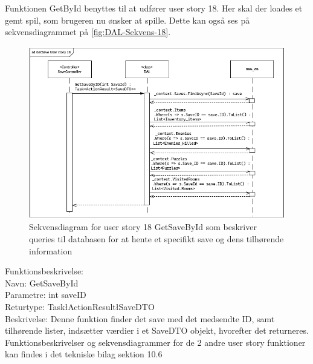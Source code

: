 Funktionen GetById benyttes til at udfører user story 18.
Her skal der loades et gemt spil, som brugeren nu ønsker at spille. 
Dette kan også ses på sekvensdiagrammet på \autoref{fig:DAL-Sekvens-18}.\\

\begin{figure}[H]
\centering
\includegraphics[width = \textwidth]{02-Body/Images/DAL-Database/GetSavesByIdSd.PNG}
\caption{Sekvensdiagram for user story 18 GetSaveById som beskriver queries til databasen for at hente et specifikt save og dens tilhørende information}
\label{fig:DAL-Sekvens-18}
\end{figure}

Funktionsbeskrivelse:\\
Navn: GetSaveById \\
Parametre: int saveID\\
Returtype: Task\l ActionResult\l SaveDTO\g\g\\
Beskrivelse: Denne funktion finder det save med det medsendte ID, samt tilhørende lister, indsætter værdier i et SaveDTO objekt, hvorefter det returneres.\\

Funktionsbeskrivelser og sekvensdiagrammer for de 2 andre user story funktioner kan findes i det tekniske bilag sektion 10.6